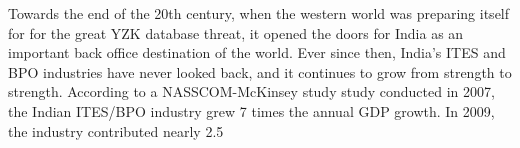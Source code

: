 Towards the end of the 20th century, when the western world was preparing itself for for the great YZK database threat, it opened the doors for India as an important back office destination of the world. Ever since then, India's ITES and BPO industries  have never looked back, and it continues to grow from strength to strength. According to a NASSCOM-McKinsey study study conducted in 2007, the Indian ITES/BPO industry grew 7 times the annual GDP growth. In 2009, the industry contributed nearly 2.5%
